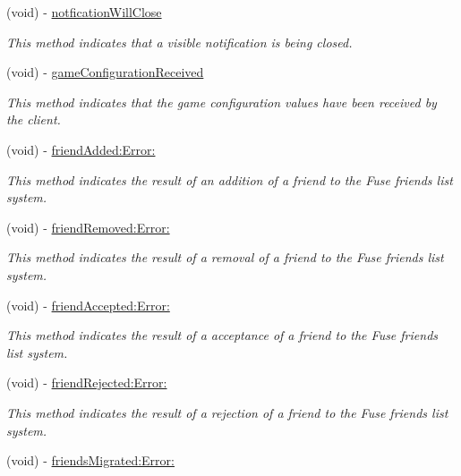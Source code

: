 \begin{DoxyCompactItemize}
(void) -\/ \hyperlink{protocol_fuse_delegate-p_ac493f7599268adadcc22e7c508b4ba61}{notfication\+Will\+Close}
\begin{DoxyCompactList}\small\item\em This method indicates that a visible notification is being closed. \end{DoxyCompactList}\item 
(void) -\/ \hyperlink{protocol_fuse_delegate-p_a1da152418e0a5dc2c1b108f501c6e627}{game\+Configuration\+Received}
\begin{DoxyCompactList}\small\item\em This method indicates that the game configuration values have been received by the client. \end{DoxyCompactList}\item 
(void) -\/ \hyperlink{protocol_fuse_delegate-p_a5c1b86ecfdc9518f976d5ea96156b408}{friend\+Added\+:\+Error\+:}
\begin{DoxyCompactList}\small\item\em This method indicates the result of an addition of a friend to the Fuse friends list system. \end{DoxyCompactList}\item 
(void) -\/ \hyperlink{protocol_fuse_delegate-p_a94ed7e39378bb2ae24ecc9c941dd0218}{friend\+Removed\+:\+Error\+:}
\begin{DoxyCompactList}\small\item\em This method indicates the result of a removal of a friend to the Fuse friends list system. \end{DoxyCompactList}\item 
(void) -\/ \hyperlink{protocol_fuse_delegate-p_ab48f8ef85f4f32654af102c5fa09c4c1}{friend\+Accepted\+:\+Error\+:}
\begin{DoxyCompactList}\small\item\em This method indicates the result of a acceptance of a friend to the Fuse friends list system. \end{DoxyCompactList}\item 
(void) -\/ \hyperlink{protocol_fuse_delegate-p_a2bc3be54c0a0a4f3cee3e9e96501c5ce}{friend\+Rejected\+:\+Error\+:}
\begin{DoxyCompactList}\small\item\em This method indicates the result of a rejection of a friend to the Fuse friends list system. \end{DoxyCompactList}\item 
(void) -\/ \hyperlink{protocol_fuse_delegate-p_adb2a01d8912d54c4a05a675e10901f6e}{friends\+Migrated\+:\+Error\+:}

\end{DoxyCompactItemize}
